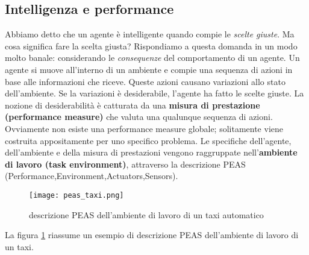  \subsection{Intelligenza e performance}
 Abbiamo detto che un agente è intelligente quando compie le \emph{scelte giuste}. Ma cosa significa fare la scelta giusta?
 Rispondiamo a questa domanda in un modo molto banale: considerando le \emph{consequenze} del comportamento di un agente.
 Un agente si muove all'interno di un ambiente e compie una sequenza di azioni in base alle informazioni che riceve.
 Queste azioni causano variazioni allo stato dell'ambiente. Se la variazioni è desiderabile, l'agente ha fatto le scelte giuste.
 La nozione di desiderabilità è catturata da una \textbf{misura di prestazione (performance measure)} che valuta una qualunque sequenza di azioni.
 Ovviamente non esiste una performance measure globale; solitamente viene costruita appositamente  per uno specifico problema.
 Le specifiche dell'agente, dell'ambiente e della misura di prestazioni vengono raggruppate nell'\textbf{ambiente di lavoro (task environment)},
 attraverso la descrizione PEAS (Performance,Environment,Actuators,Sensors)\cite{aima}.
 \begin{figure}
  \texttt{[image: peas\_taxi.png]}
  \caption{descrizione PEAS dell'ambiente di lavoro di un taxi automatico\cite{aima}}
  \label{fig:taxi}
 \end{figure}
 La figura \ref{fig:taxi} riassume un esempio di descrizione PEAS dell'ambiente di lavoro di un taxi.
